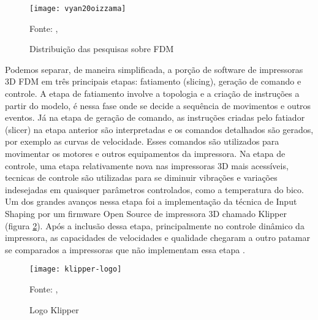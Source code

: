 \begin{figure}[!htb]
    \centering
    \caption{Distribuição das pesquisas sobre FDM}
    \texttt{[image: vyan20oizzama]}

    {\footnotesize Fonte: \citeauthor{vyavahare20}, \citeyear{vyavahare20}}
    \label{fig:distr_artigos}
\end{figure}

Podemos separar, de maneira simplificada, a porção de software de impressoras 3D
FDM em três principais etapas: fatiamento (slicing), geração de comando e controle.
A etapa de fatiamento involve a topologia e a criação de instruções a partir do modelo,
é nessa fase onde se decide a sequência de movimentos e outros eventos.
Já na etapa de geração de comando, as instruções criadas pelo fatiador (slicer) na etapa anterior
são interpretadas e os comandos detalhados são gerados, por exemplo as curvas de velocidade.
Esses comandos são utilizados para movimentar os motores e outros equipamentos da impressora.
Na etapa de controle, uma etapa relativamente nova nas impressoras 3D mais acessíveis, 
tecnicas de controle são utilizadas para se diminuir vibrações e variações indesejadas em quaisquer
parâmetros controlados, como a temperatura do bico. Um dos grandes avanços nessa etapa
foi a implementação da técnica de Input Shaping por um firmware Open Source de impressora 3D chamado Klipper (figura \ref{fig:klipper_logo}).
Após a inclusão dessa etapa, principalmente no controle dinâmico da impressora, as capacidades
de velocidades e qualidade chegaram a outro patamar se comparados a impressoras que não implementam essa etapa \cite{klipperdoc}.

\begin{figure}[!htb]
    \centering
    \caption{Logo Klipper}
    \texttt{[image: klipper-logo]}

    {\footnotesize Fonte: \citeauthor{klipperdoc}, \citeyear{klipperdoc}}
    \label{fig:klipper_logo}
\end{figure}

